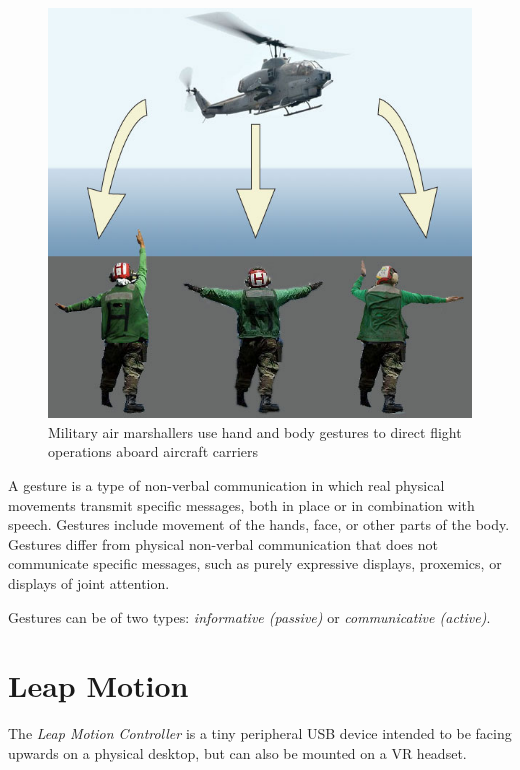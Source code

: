 \documentclass[12pt,a4paper,twoside]{report}
\begin{document}
\begin{figure}
  \includegraphics[width=0.9\linewidth]{img/Gesture_navy.jpg}
  \caption{Military air marshallers use hand and body gestures to direct flight operations aboard aircraft carriers}
  \label{fig:air_marshallers}
\end{figure}

A gesture is a type of non-verbal communication in which real physical movements transmit specific messages, both in place or in combination with speech. Gestures include movement of the hands, face, or other parts of the body. Gestures differ from physical non-verbal communication that does not communicate specific messages, such as purely expressive displays, proxemics, or displays of joint attention. \cite{Gestures}

Gestures can be of two types: \textit{informative (passive)} or \textit{communicative (active)}. 

\section{Leap Motion}

The \textit{Leap Motion Controller} is a tiny peripheral USB device intended to be facing upwards on a physical desktop, but can also be mounted on a VR headset.
\end{document}
